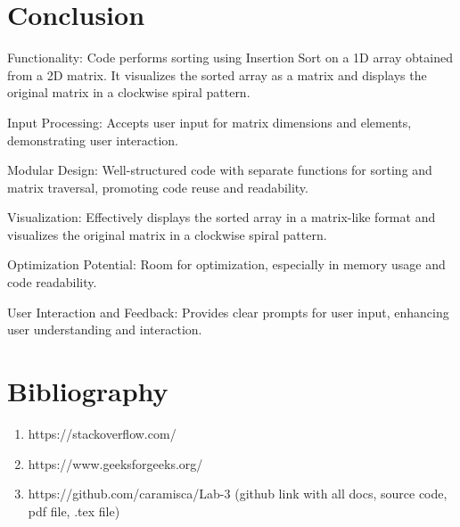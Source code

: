 \documentclass[12pt]{article}
\begin{document}
\section*{Conclusion}
\hspace{0.8cm}
Functionality: Code performs sorting using Insertion Sort on a 1D array obtained from a 2D matrix. It visualizes the sorted array as a matrix and displays the original matrix in a clockwise spiral pattern.

Input Processing: Accepts user input for matrix dimensions and elements, demonstrating user interaction.

Modular Design: Well-structured code with separate functions for sorting and matrix traversal, promoting code reuse and readability.

Visualization: Effectively displays the sorted array in a matrix-like format and visualizes the original matrix in a clockwise spiral pattern.

Optimization Potential: Room for optimization, especially in memory usage and code readability.

User Interaction and Feedback: Provides clear prompts for user input, enhancing user understanding and interaction.


\section*{Bibliography}
\hspace{0.8cm}
\begin{enumerate}
  \item https://stackoverflow.com/
  \item https://www.geeksforgeeks.org/
  \item https://github.com/caramisca/Lab-3  (github link with all docs, source code, pdf file, .tex file)
\end{enumerate}

\pagebreak
\end{document}
